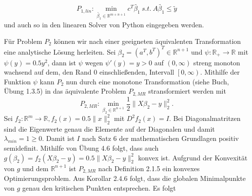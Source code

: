\documentclass[ngerman, a4paper,12pt]{article}
\begin{document}
\begin{equation*}
	P_{1, lin}: \min_{\tilde{\beta_1} \in \mathbb{R}^{m+n+1} } c^T \tilde{\beta_1} \ s.t. \ A \tilde{\beta_1} \leq \tilde{y}
\end{equation*}
und auch so in den linearen Solver von Python eingegeben werden. \par
Für Problem $P_2$ können wir nach einer geeigneten äquivalenten Transformation eine analytische Lösung herleiten. Sei $\beta_2 = (a^T, b^T)^T \in \mathbb{R}^{n+1}$ und $\psi: \mathbb{R}_+ \rightarrow \mathbb{R}$ mit $\psi(y)=0.5y^2$, dann ist $\psi$ wegen $\psi'(y)=y > 0$ auf $(0, \infty)$ streng monoton wachsend auf dem, den Rand $0$ einschließenden, Intervall $\left[0, \infty \right)$. Mithilfe der Funktion $\psi$ kann $P_2$ nun durch eine monotone Transformation (siehe Buch, Übung 1.3.5) in das äquivalente Problem $P_{2, MR}$ stransformiert werden mit
\begin{equation*}
	P_{2, MR}:\min_{\beta_2 \in \mathbb{R}^{n+1}} \frac{1}{2} \|X \beta_2 - y \|_2^2.
\end{equation*}
Sei $f_2: \mathbb{R}^m \rightarrow \mathbb{R}, f_2(x) = 0.5 \| x \|_2^2$ mit $D^2f_2(x)=I$. Bei Diagonalmatritzen sind die Eigenwerte genau die Elemente auf der Diagonalen und damit $\lambda_{min} =1 \geq 0$. Damit ist $I$ nach Satz 6 der mathematischen Grundlagen positiv semidefinit. Mithilfe von Übung 4.6 folgt, dass auch $g(\beta_2) = f_2(X \beta_2 - y) = 0.5 \| X \beta_2 - y \|_2^2$ konvex ist. Aufgrund der Konvexität von $g$ und dem $\mathbb{R}^{n+1}$ ist $P_{2,MR}$ nach Definition 2.1.5 ein konvexes Optimierungsproblem. Aus Korollar 2.4.6 folgt, dass die globalen Minimalpunkte von $g$ genau den kritischen Punkten entsprechen. Es folgt
\end{document}
